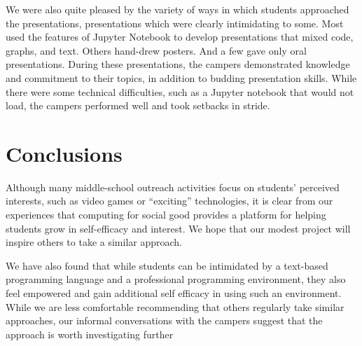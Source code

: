 We were also quite pleased by the variety of ways in which students
approached the presentations, presentations which were clearly
intimidating to some.  Most used the features of Jupyter Notebook
to develop presentations that mixed code, graphs, and text.  Others
hand-drew posters.  And a few gave only oral presentations.  During
these presentations, the campers demonstrated knowledge and commitment
to their topics, in addition to budding presentation skills. While
there were some technical difficulties, such as a Jupyter notebook
that would not load, the campers performed well and took setbacks
in stride.

\section{Conclusions}

Although many middle-school outreach activities focus on students'
perceived interests, such as video games or ``exciting'' technologies,
it is clear from our experiences that computing for social good
provides a platform for helping students grow in self-efficacy and
interest.  We hope that our modest project will inspire others to
take a similar approach.

We have also found that while students can be intimidated by a text-based
programming language and a professional programming environment, they also
feel empowered and gain additional self efficacy in using such an environment.
While we are less comfortable recommending that others regularly take similar
approaches, our informal conversations with the campers suggest that the
approach is worth investigating further
